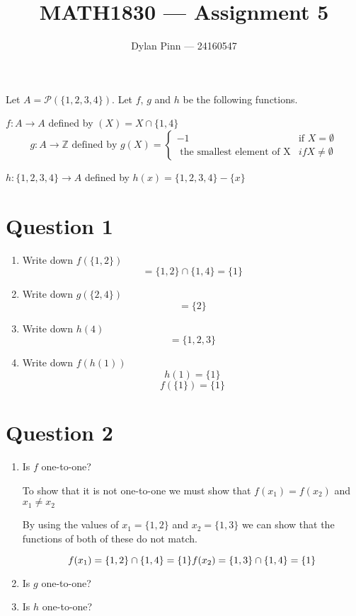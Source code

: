 \documentclass[11pt]{article}
\begin{document}
\title{MATH1830 --- Assignment 5}
\author{Dylan Pinn --- 24160547}
\maketitle

Let $A = \mathcal{P}(\{1,2,3,4\})$. Let $f$, $g$ and $h$ be the following functions.

$ f: A \to A$ defined by $(X) = X \cap \{1,4\}$
\begin{equation*}
  g: A \to \mathbb{Z} \text { defined by } g(X) =
  \begin{cases} 
      -1 & \text{if } X = \emptyset \\
      \text{ the smallest element of X} & if X \not = \emptyset 
   \end{cases}
\end{equation*}

$h: \{1,2,3,4\} \to A$ defined by $h(x)=\{1,2,3,4\} - \{x\}$

\section*{Question 1}
  
\begin{enumerate}[label=(\roman*)]
  \item Write down $f(\{1,2\})$
  $$= \{1,2\} \cap \{1,4\} = \{1\}$$

  \item Write down $g(\{2,4\})$
  $$= \{2\}$$

  \item Write down $h(4)$
  $$= \{1,2,3\}$$

  \item Write down $f(h(1))$
  $$h(1) = \{1\}$$
  $$f(\{1\}) = \{1\}$$
\end{enumerate}

\break
\section*{Question 2}

\begin{enumerate}[label=(\roman*)]
  \item Is $f$ one-to-one?
  
  To show that it is not one-to-one we must show that $f(x_1) = f(x_2)$ and $x_1 \not = x_2$
  
  By using the values of $x_1 = \{1,2\}$ and $x_2 = \{1,3\}$ we can show that the functions of both of these do not match.
  
  \begin{equation*}
    f(x_1) = \{1,2\} \cap \{1,4\} = \{1\} \\
    f(x_2) = \{1,3\} \cap \{1,4\} = \{1\}
  \end{equation*}
  
  \item Is $g$ one-to-one?
  \item Is $h$ one-to-one?
\end{enumerate}
\end{document}
